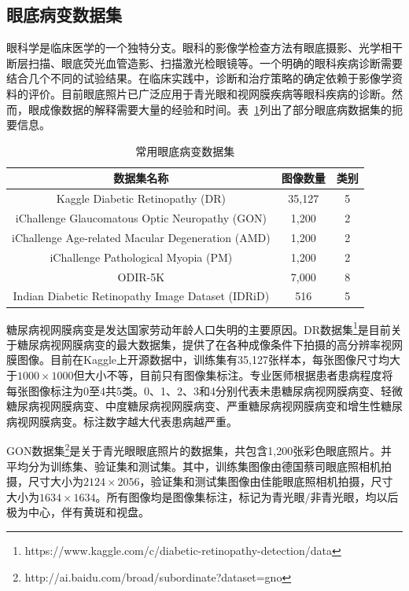 \subsection{眼底病变数据集}\label{subsec:original_dr_dataset_intro}
眼科学是临床医学的一个独特分支。眼科的影像学检查方法有眼底摄影、光学相干断层扫描、眼底荧光血管造影、扫描激光检眼镜等。一个明确的眼科疾病诊断需要结合几个不同的试验结果。在临床实践中，诊断和治疗策略的确定依赖于影像学资料的评价。目前眼底照片已广泛应用于青光眼和视网膜疾病等眼科疾病的诊断。然而，眼成像数据的解释需要大量的经验和时间。表~\ref{tab:datasets_info}列出了部分眼底病数据集的扼要信息。
\begin{table}[h]
	\centering
	\caption{常用眼底病变数据集}
	\label{tab:datasets_info}
	\begin{tabular}{c|c|c}
		\toprule[2pt]
		数据集名称 & 图像数量 & 类别 \\
		\midrule[2pt]
		Kaggle Diabetic Retinopathy (DR)	& 35,127	& 5	 \\
		\hline                         
		iChallenge Glaucomatous Optic Neuropathy (GON)    & 1,200    & 2 \\ \hline
		iChallenge Age-related Macular Degeneration (AMD) & 1,200    & 2  \\ \hline
		iChallenge Pathological Myopia (PM)               & 1,200    & 2 \\ \hline
		ODIR-5K & 7,000 & 8 \\ \hline
		
		Indian Diabetic Retinopathy Image Dataset (IDRiD) & 516 & 5  \\
		\bottomrule[2pt]
	\end{tabular}
\end{table}

糖尿病视网膜病变是发达国家劳动年龄人口失明的主要原因。DR数据集\footnote{https://www.kaggle.com/c/diabetic-retinopathy-detection/data}是目前关于糖尿病视网膜病变的最大数据集，提供了在各种成像条件下拍摄的高分辨率视网膜图像。目前在Kaggle上开源数据中，训练集有35,127张样本，每张图像尺寸均大于$1000\times 1000$但大小不等，目前只有图像集标注。专业医师根据患者患病程度将每张图像标注为0至4共5类。0、1、2、3和4分别代表未患糖尿病视网膜病变、轻微糖尿病视网膜病变、中度糖尿病视网膜病变、严重糖尿病视网膜病变和增生性糖尿病视网膜病变。标注数字越大代表患病越严重。

GON数据集\footnote{http://ai.baidu.com/broad/subordinate?dataset=gno}是关于青光眼眼底照片的数据集，共包含1,200张彩色眼底照片。并平均分为训练集、验证集和测试集。其中，训练集图像由德国蔡司眼底照相机拍摄，尺寸大小为$2124\times 2056$，验证集和测试集图像由佳能眼底照相机拍摄，尺寸大小为$1634\times 1634 $。所有图像均是图像集标注，标记为青光眼/非青光眼，均以后极为中心，伴有黄斑和视盘。

